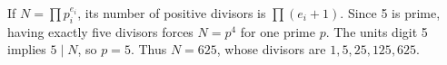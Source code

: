 If $N=\prod p_i^{e_i}$, its number of positive divisors is $\prod(e_i+1)$. Since 5 is prime, having exactly five divisors forces $N=p^4$ for one prime $p$. The units digit 5 implies $5\mid N$, so $p=5$. Thus $\boxed{N=625}$, whose divisors are $1,5,25,125,625$.
